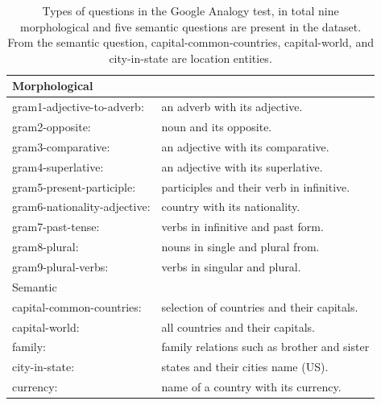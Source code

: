 \begin{table}[h]
\centering

\begin{tabular}{ll}
        \toprule
{Morphological} & \\         \midrule

gram1-adjective-to-adverb:& an adverb with its adjective.            \\ \hline
gram2-opposite: &noun and its opposite.                          \\ \hline
gram3-comparative: & an adjective with its comparative.                                           \\ \hline
gram4-superlative:&an adjective with its superlative.                                                    \\ \hline
gram5-present-participle:&participles and their verb in infinitive.                                           \\ \hline
gram6-nationality-adjective:&country with its nationality.                                                                \\ \hline
gram7-past-tense: &verbs in infinitive and past form.                                                             \\ \hline
gram8-plural:& nouns in single and plural from.                                                         \\ \hline
gram9-plural-verbs: &verbs in singular and plural.                                                          \\ 
\midrule
\midrule
{Semantic}&\\   
\midrule

capital-common-countries:                 &           selection of countries and their capitals.\\ \hline
capital-world:          &        all countries and their capitals.    \\ \hline
family:     &             family relations such as brother and sister  \\ \hline
city-in-state:   &      states and their cities name (US). \\ \hline
currency:    &        name of a country with its currency.  \\
\bottomrule
\end{tabular}
 \caption{Types of questions in the Google Analogy test, in total nine
  morphological and five semantic questions are present in the dataset. From the semantic question, capital-common-countries, capital-world, and city-in-state are location entities.} 
  \label{table:analogy_types}
\end{table}

